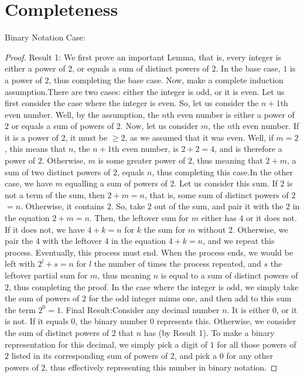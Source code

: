 \documentclass{article}
\theoremstyle{definition}
\begin{document}
\section*{Completeness}
Binary Notation Case:\newline
\begin{proof}
Result 1: \newline We first prove an important Lemma, that is, every integer is either a power of $2$, or equals a sum of distinct powers of $2$.
In the base case, $1$ is a power of $2$, thus completing the base case. Now, make a complete induction assumption.There are two cases: either the integer
is odd, or it is even. Let us first consider the case where the integer is even. So, let us consider the $n+1$th even
number. Well, by the assumption, the $n$th even number is either a power of $2$ or equals a sum of powers of $2$. Now, let us consider $m$, the $n$th even
number. If it is a power of $2$, it must be $\ge 2$, as we assumed that it was even. Well, if $m=2$, this means that $n$, the $n+1$th even number, is
$2+2=4$, and is therefore a power of $2$. Otherwise, $m$ is some greater power of $2$, thus meaning that $2+m$, a sum of two distinct powers of $2$, equals
$n$, thus completing this case.\newline In the other case, we have $m$ equalling a sum of powers of $2$. Let us consider this sum. If $2$ is not a term of
the sum, then $2+m=n$, that is, some sum of distinct powers of $2$ $=n$. Otherwise, it contains $2$. So, take $2$ out of the sum, and pair it with the $2$
in the equation $2+m=n$. Then, the leftover sum for $m$ either has $4$ or it does not. If it does not, we have $4+k=n$ for $k$ the sum for $m$ without $2$.
Otherwise, we pair the $4$ with the leftover $4$ in the equation $4+k=n$, and we repeat this process. Eventually, this process must end. When the process
ends, we would be left with $2^l+s=n$ for $l$ the number of times the process repeated, and $s$ the leftover partial sum for $m$, thus meaning $n$ is equal
to a sum of distinct powers of $2$, thus completing the proof. In the case where the integer is odd, we simply take the sum of powers of $2$ for the
odd integer minus one, and then add to this sum the term $2^0=1$.
\newline Final Result:\newline Consider any decimal number $n$. It is either $0$, or it is not. If it equals $0$, the binary number $0$ represents this. 
Otherwise, we consider the sum of distinct powers of $2$ that $n$ has (by Result 1). To make a binary representation for this decimal, we simply
pick a digit of $1$ for all those powers of $2$ listed in its corresponding sum of powers of $2$, and pick a $0$ for any other powers of $2$, thus 
effectively representing this number in binary notation.
\end{proof}
\end{document}
